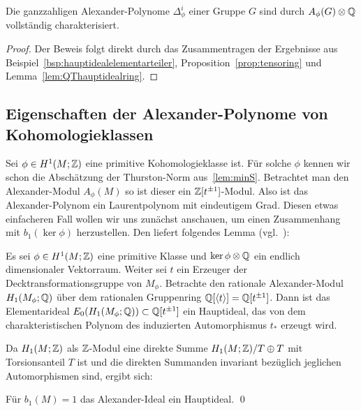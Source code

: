 \begin{cor}
	Die ganzzahligen Alexander-Polynome $\Delta_\phi^i$ einer Gruppe $G$ sind durch $A_\phi(G) \otimes \mathbb{Q}$ vollständig charakterisiert.
\end{cor}
\begin{proof}
	Der Beweis folgt direkt durch das Zusammentragen der Ergebnisse aus Beispiel~\ref{bsp:hauptidealelementarteiler}, Proposition~\ref{prop:tensoring} und Lemma~\ref{lem:QThauptidealring}.
\end{proof}

    \subsection{Eigenschaften der Alexander-Polynome von Kohomologieklassen}
        Sei $\phi\in H^1(M;\mathbb{Z})$ eine primitive Kohomologieklasse ist. Für solche $\phi$ kennen wir schon die Abschätzung der Thurston-Norm aus~\ref{lem:minS}. Betrachtet man den Alexander-Modul $A_\phi(M)$ so ist dieser ein $\mathbb{Z}[t^{\pm1}]$-Modul. Also ist das Alexander-Polynom ein Laurentpolynom mit eindeutigem Grad. Diesen etwas einfacheren Fall wollen wir uns zunächst anschauen, um einen Zusammenhang mit $b_1(\ker\phi)$ herzustellen. Den liefert folgendes Lemma (vgl.~\cite[Assertion~4]{Milnor.2009}):
\begin{lem}
	\label{lem:charPol}
	Es sei $\phi \in H^1(M;\mathbb{Z})$ eine primitive Klasse und $\ker \phi \otimes \mathbb{Q}$ ein endlich dimensionaler Vektorraum. Weiter sei $t$ ein Erzeuger der Decktransformationsgruppe von $M_\phi$. Betrachte den rationale Alexander-Modul $H_1(M_\phi;\mathbb{Q})$ über dem rationalen Gruppenring $\mathbb{Q}[\langle t \rangle] = \mathbb{Q}[t^{\pm 1}]$. Dann ist das Elementarideal $E_0(H_1(M_\phi;\mathbb{Q}))\subset \mathbb{Q}[t^{\pm1}]$ ein Hauptideal, das von dem charakteristischen Polynom des induzierten Automorphismus $t_*$ erzeugt wird.
\end{lem}
Da $H_1(M;\mathbb{Z})$ als $\mathbb{Z}$-Modul eine direkte Summe $H_1(M;\mathbb{Z})/T \oplus T$ mit Torsionsanteil $T$ ist und die direkten Summanden invariant bezüglich jeglichen Automorphismen sind, ergibt sich:
\begin{cor}
	Für $b_1(M)=1$ das Alexander-Ideal ein Hauptideal. \qed
\end{cor}

